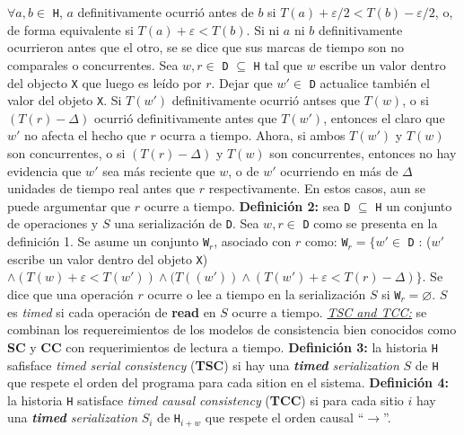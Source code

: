 $\forall a, b \in$ \texttt{H}, $a$ definitivamente ocurrió antes de $b$ si $T(a) + \varepsilon/2 < T(b) - \varepsilon/2$, o, de forma equivalente si $T(a) + \varepsilon < T(b)$. Si ni $a$ ni $b$ definitivamente ocurrieron antes que el otro, se se dice que sus marcas de tiempo son no comparales o concurrentes. Sea $w, r \in$ \texttt{D} $\subseteq$ \texttt{H} tal que $w$ escribe un valor dentro del objecto \texttt{X} que luego es leído por $r$. Dejar que $w' \in$ \texttt{D} actualice también el valor del objeto \texttt{X}. Si $T(w')$ definitivamente ocurrió antses que $T(w)$, o si $(T(r) - \Delta)$ ocurrió definitivamente antes que $T(w')$, entonces el claro que $w'$ no afecta el hecho que $r$ ocurra a tiempo. Ahora, si ambos $T(w')$ y $T(w)$ son concurrentes, o si $(T(r) - \Delta)$ y $T(w)$ son concurrentes, entonces no hay evidencia que $w'$ sea más reciente que $w$, o de $w'$ ocurriendo en más de $\Delta$ unidades de tiempo real antes que $r$ respectivamente. En estos casos, aun se puede argumentar que $r$ ocurre a tiempo. \textbf{Definición 2:} sea \texttt{D} $\subseteq$ \texttt{H} un conjunto de operaciones y $S$ una serialización de \texttt{D}. Sea $w, r \in$ \texttt{D} como se presenta en la definición 1. Se asume un conjunto \texttt{W}$_r$, asociado con $r$ como: \texttt{W}$_r = \{w' \in$ \texttt{D} : ($w'$ escribe un valor dentro del objeto \texttt{X}) $\wedge (T(w) + \varepsilon < T(w')) \wedge (T((w')) \wedge (T(w') + \varepsilon < T(r) - \Delta)\}$. Se dice que una operación $r$ ocurre o lee a tiempo en la serialización $S$ si \texttt{W}$_r = \varnothing$. $S$ es \emph{timed} si cada operación de \textbf{read} en $S$ ocurre a tiempo. \underline{\emph{TSC and TCC:}} se combinan los requereimientos de los modelos de consistencia bien conocidos como \textbf{SC} y \textbf{CC} con requerimientos de lectura a tiempo. \textbf{Definición 3:} la historia \texttt{H} safisface \emph{timed serial consistency} (\textbf{TSC}) si hay una \emph{\textbf{timed} serialization} $S$ de \texttt{H} que respete el orden del programa para cada sition en el sistema. \textbf{Definición 4:} la  historia \texttt{H} satisface \emph{timed causal consistency} (\textbf{TCC}) si para cada sitio $i$ hay una \emph{\textbf{timed} serialization} $S_i$ de \texttt{H}$_{i+w}$ que respete el orden causal ``$\to$''.

